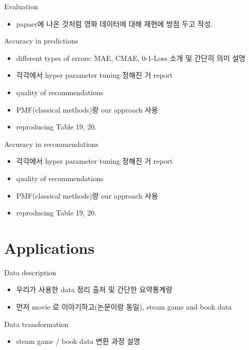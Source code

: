 \documentclass{beamer}
\begin{document}
\begin{frame}{Evaluation}
    \begin{itemize}
        \item papaer에 나온 것처럼 영화 데이터에 대해 재현에 방점 두고 작성.
    \end{itemize}
\end{frame}

\begin{frame}{Accuracy in predictions}
    \begin{itemize}
        \item different types of errors: MAE, CMAE, 0-1-Loss 소개 및 간단히 의미 설명
        \item 각각에서 hyper parameter tuning 정해진 거 report
        \item quality of recommendations
        \item PMF(classical methods)랑 our approach 사용
        \item reproducing Table 19, 20.
    \end{itemize}
\end{frame}

\begin{frame}{Accuracy in recommendations}
    \begin{itemize}
        \item 각각에서 hyper parameter tuning 정해진 거 report
        \item quality of recommendations
        \item PMF(classical methods)랑 our approach 사용
        \item reproducing Table 19, 20.
    \end{itemize}
\end{frame}


\section{Applications}
\begin{frame}{Data description}
    \begin{itemize}
        \item 우리가 사용한 data 정리 출처 및 간단한 요약통계량
        \item 먼저 movie 로 이야기하고(논문이랑 동일), steam game and book data
    \end{itemize}
\end{frame}

\begin{frame}{Data transformation}
    \begin{itemize}
        \item steam game / book data 변환 과정 설명
    \end{itemize}
\end{frame}
\end{document}

